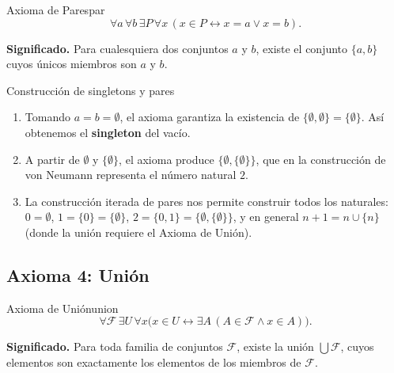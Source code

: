 \begin{definicion}{Axioma de Pares}{par}
\[
  \forall a\,\forall b\,\exists P\,\forall x\,(x \in P \leftrightarrow x = a \vee x = b).
\]
\end{definicion}

\textbf{Significado.} Para cualesquiera dos conjuntos $a$ y $b$, existe el conjunto $\{a, b\}$ cuyos únicos miembros son $a$ y $b$.

\begin{ejemplo}{Construcción de singletons y pares}{}
\begin{enumerate}[leftmargin=2em, label=(\alph*)]
  \item Tomando $a = b = \emptyset$, el axioma garantiza la existencia de $\{\emptyset, \emptyset\} = \{\emptyset\}$. Así obtenemos el \textbf{singleton} del vacío.

  \item A partir de $\emptyset$ y $\{\emptyset\}$, el axioma produce $\{\emptyset, \{\emptyset\}\}$, que en la construcción de von Neumann representa el número natural $2$.

  \item La construcción iterada de pares nos permite construir todos los naturales: $0 = \emptyset$, $1 = \{0\} = \{\emptyset\}$, $2 = \{0,1\} = \{\emptyset, \{\emptyset\}\}$, y en general $n+1 = n \cup \{n\}$ (donde la unión requiere el Axioma de Unión).
\end{enumerate}
\end{ejemplo}

\subsection{Axioma 4: Unión}

\begin{definicion}{Axioma de Unión}{union}
\[
  \forall \mathcal{F}\,\exists U\,\forall x\bigl(x \in U \leftrightarrow \exists A\,(A \in \mathcal{F} \wedge x \in A)\bigr).
\]
\end{definicion}

\textbf{Significado.} Para toda familia de conjuntos $\mathcal{F}$, existe la unión $\bigcup \mathcal{F}$, cuyos elementos son exactamente los elementos de los miembros de $\mathcal{F}$.

